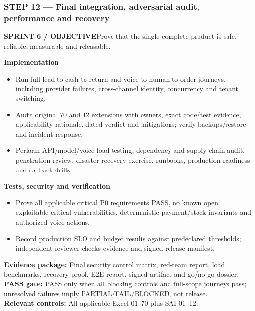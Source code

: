 \documentclass[10.5pt,a4paper,oneside]{article}
\newcommand{\eyebrow}[1]{{\sffamily\footnotesize\bfseries\color{gold}\MakeUppercase{#1}}}
\begin{document}
\subsubsection*{STEP 12 --- Final integration, adversarial audit, performance and recovery}
\eyebrow{Sprint 6 / objective}\quad Prove that the single complete product is safe, reliable, measurable and releasable.
\begin{tcolorbox}[colback=warm,colframe=line,boxrule=.45pt,arc=2pt,left=8pt,right=8pt,top=6pt,bottom=6pt]\textbf{Implementation}
\begin{itemize}
\item Run full lead-to-cash-to-return and voice-to-human-to-order journeys, including provider failures, cross-channel identity, concurrency and tenant switching.
\item Audit original 70 and 12 extensions with owners, exact code/test evidence, applicability rationale, dated verdict and mitigations; verify backups/restore and incident response.
\item Perform API/model/voice load testing, dependency and supply-chain audit, penetration review, disaster recovery exercise, runbooks, production readiness and rollback drills.
\end{itemize}
\textbf{Tests, security and verification}
\begin{itemize}
\item Prove all applicable critical P0 requirements PASS, no known open exploitable critical vulnerabilities, deterministic payment/stock invariants and authorized voice actions.
\item Record production SLO and budget results against predeclared thresholds; independent reviewer checks evidence and signed release manifest.
\end{itemize}
\textbf{Evidence package:} Final security control matrix, red-team report, load benchmarks, recovery proof, E2E report, signed artifact and go/no-go dossier.\\
\textbf{PASS gate:} PASS only when all blocking controls and full-scope journeys pass; unresolved failures imply PARTIAL/FAIL/BLOCKED, not release.\\
\textbf{Relevant controls:} All applicable Excel 01--70 plus SAI-01--12.
\end{tcolorbox}
\end{document}

